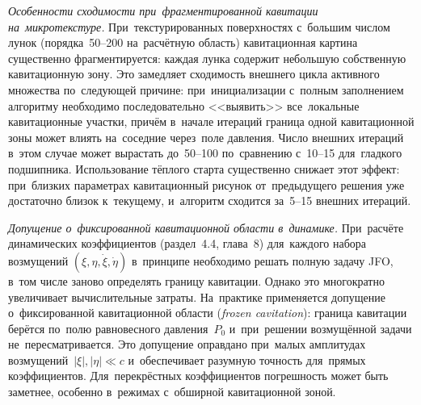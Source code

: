 \textit{Особенности сходимости при~фрагментированной кавитации на~микротекстуре.}
При~текстурированных поверхностях с~большим числом лунок (порядка~50--200 на~расчётную область) кавитационная картина существенно фрагментируется: каждая лунка содержит небольшую собственную кавитационную зону. Это замедляет сходимость внешнего цикла активного множества по~следующей причине: при~инициализации с~полным заполнением алгоритму необходимо последовательно <<выявить>> все~локальные кавитационные участки, причём в~начале итераций граница одной кавитационной зоны может влиять на~соседние через~поле давления. Число внешних итераций в~этом случае может вырастать до~50--100 по~сравнению с~10--15 для~гладкого подшипника. Использование тёплого старта существенно снижает этот эффект: при~близких параметрах кавитационный рисунок от~предыдущего решения уже достаточно близок к~текущему, и~алгоритм сходится за~5--15 внешних итераций.

\textit{Допущение о~фиксированной кавитационной области в~динамике.}
При~расчёте динамических коэффициентов (раздел~4.4, глава~8) для~каждого набора возмущений $(\xi, \eta, \dot\xi, \dot\eta)$ в~принципе необходимо решать полную задачу JFO, в~том числе заново определять границу кавитации. Однако это многократно увеличивает вычислительные затраты. На~практике применяется допущение о~фиксированной кавитационной области (\textit{frozen cavitation}): граница кавитации берётся по~полю равновесного давления~$P_0$ и~при~решении возмущённой задачи не~пересматривается. Это допущение оправдано при~малых амплитудах возмущений~$|\xi|, |\eta| \ll c$ и~обеспечивает разумную точность для~прямых коэффициентов. Для~перекрёстных коэффициентов погрешность может быть заметнее, особенно в~режимах с~обширной кавитационной зоной.
